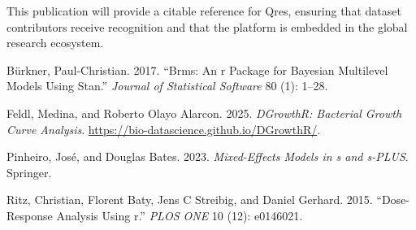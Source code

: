\documentclass[
]{article}
\newlength{\cslhangindent}
\newenvironment{CSLReferences}[2] %
 {\begin{list}{}{%
  \setlength{\itemindent}{0pt}
  \setlength{\leftmargin}{0pt}
  \setlength{\parsep}{0pt}
  \ifodd #1
   \setlength{\leftmargin}{\cslhangindent}
   \setlength{\itemindent}{-1\cslhangindent}
  \fi
  \setlength{\itemsep}{#2\baselineskip}}}
 {\end{list}}
\begin{document}
This publication will provide a citable reference for Qres, ensuring
that dataset contributors receive recognition and that the platform is
embedded in the global research ecosystem.

\label{refs}
\begin{CSLReferences}{1}{0}
Bürkner, Paul-Christian. 2017. {``Brms: An r Package for Bayesian
Multilevel Models Using Stan.''} \emph{Journal of Statistical Software}
80 (1): 1--28.

Feldl, Medina, and Roberto Olayo Alarcon. 2025. \emph{DGrowthR:
Bacterial Growth Curve Analysis}.
\url{https://bio-datascience.github.io/DGrowthR/}.

Pinheiro, José, and Douglas Bates. 2023. \emph{Mixed-Effects Models in s
and s-PLUS}. Springer.

Ritz, Christian, Florent Baty, Jens C Streibig, and Daniel Gerhard.
2015. {``Dose-Response Analysis Using r.''} \emph{PLOS ONE} 10 (12):
e0146021.

\end{CSLReferences}
\end{document}
